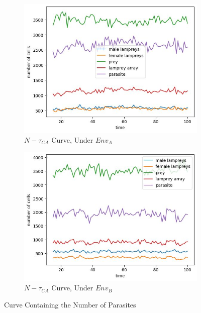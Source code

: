 \documentclass{mcmthesis}
\begin{document}
\begin{figure}[H]
  \centering
  \begin{subfigure}[b]{0.45\textwidth}
    \includegraphics[width=\textwidth]{figures/6_4_figur1.png}
    \caption{$N-\tau_{CA}$ Curve, Under $Env_{A}$}
    \label{fig:sub1}
  \end{subfigure}
  \hfill
  \begin{subfigure}[b]{0.45\textwidth}
    \includegraphics[width=\textwidth]{figures/6_4_figur2.png}
    \caption{$N-\tau_{CA}$ Curve, Under $Env_{B}$}
    \label{fig:sub2}
  \end{subfigure}

  \caption{Curve Containing the Number of Parasites}
  \label{fig:Simulation of Disaster}
\end{figure}
 
\end{document}
